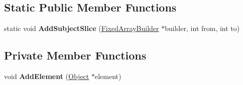 \subsection*{Static Public Member Functions}
\begin{DoxyCompactItemize}
\item 
static void {\bfseries Add\+Subject\+Slice} (\hyperlink{classv8_1_1internal_1_1_fixed_array_builder}{Fixed\+Array\+Builder} $\ast$builder, int from, int to)\hypertarget{classv8_1_1internal_1_1_replacement_string_builder_aba524477fe28f1c8ae3f7c9f2d969208}{}\label{classv8_1_1internal_1_1_replacement_string_builder_aba524477fe28f1c8ae3f7c9f2d969208}

\end{DoxyCompactItemize}
\subsection*{Private Member Functions}
\begin{DoxyCompactItemize}
\item 
void {\bfseries Add\+Element} (\hyperlink{classv8_1_1internal_1_1_object}{Object} $\ast$element)\hypertarget{classv8_1_1internal_1_1_replacement_string_builder_a1afbecacb50ed9de70c2461f7c02b47d}{}\label{classv8_1_1internal_1_1_replacement_string_builder_a1afbecacb50ed9de70c2461f7c02b47d}

\end{DoxyCompactItemize}

